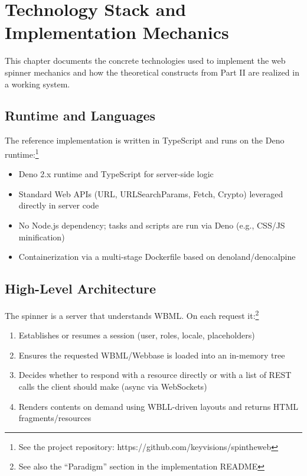\chapter{Technology Stack and Implementation Mechanics}
\label{chap:implementation-tech}

This chapter documents the concrete technologies used to implement the web spinner mechanics and how the theoretical constructs from Part II are realized in a working system.

\section{Runtime and Languages}
The reference implementation is written in TypeScript and runs on the Deno runtime:\footnote{See the project repository: https://github.com/keyvisions/spintheweb}
\begin{itemize}
  \item Deno 2.x runtime and TypeScript for server-side logic
  \item Standard Web APIs (URL, URLSearchParams, Fetch, Crypto) leveraged directly in server code
  \item No Node.js dependency; tasks and scripts are run via Deno (e.g., CSS/JS minification)
  \item Containerization via a multi-stage Dockerfile based on denoland/deno:alpine
\end{itemize}

\section{High-Level Architecture}
The spinner is a server that understands WBML. On each request it:\footnote{See also the ``Paradigm'' section in the implementation README}
\begin{enumerate}
  \item Establishes or resumes a session (user, roles, locale, placeholders)
  \item Ensures the requested WBML/Webbase is loaded into an in-memory tree
  \item Decides whether to respond with a resource directly or with a list of REST calls the client should make (async via WebSockets)
  \item Renders contents on demand using WBLL-driven layouts and returns HTML fragments/resources
\end{enumerate}

